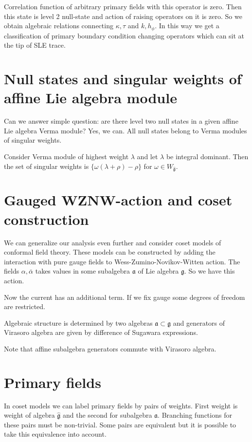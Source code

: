 \documentclass[a4paper]{article}
\newcommand{\gfh}{\hat{\mathfrak{g}}}
\newcommand{\gf}{\mathfrak{g}}
\newcommand{\af}{\mathfrak{a}}
\begin{document}
Correlation function of arbitrary primary fields with this operator is zero. Then this state is
level 2 null-state and action of raising operators on it is zero. So we obtain algebraic relations
connecting $\kappa, \tau$ and $k, h_{\phi}$. In this way we get a classification of primary boundary
condition changing operators which can sit at the tip of SLE trace. 

\section{Null states and singular weights of affine Lie algebra module}
\label{sec:null-states-singular}

Can we answer simple question: are there level two null states in a given affine Lie algebra Verma
module? Yes, we can. All null states belong to Verma modules of singular weights. 

Consider Verma module of highest weight $\lambda$ and let $\lambda$ be integral dominant. Then the
set of singular weights is $\{\omega (\lambda+\rho)-\rho\}$ for $\omega\in W_{\gfh}$.

\section{Gauged WZNW-action and coset construction}
\label{sec:gauged-wznw-action}

We can generalize our analysis even further and consider coset models of conformal field theory.
These models can be constructed by adding the interaction with pure gauge fields to
Wess-Zumino-Novikov-Witten action. The fields $\alpha, \bar \alpha$ takes values in some subalgebra
$\af$ of Lie algebra $\gf$.  So we have this action. 

Now the current has an additional term. If we fix gauge some degrees of freedom are restricted. 

Algebraic structure is determined by two algebras $\af\subset\gf$ and generators of Virasoro algebra
are given by difference of Sugawara expressions. 

Note that affine subalgebra generators commute with Virasoro algebra. 

\section{Primary fields}
\label{sec:primary-fields-1}

In coset models we can label primary fields by pairs of weights. First weight is weight of algebra
$\gfh$ and the second for subalgebra $\af$. Branching functions for these pairs must be non-trivial.
Some pairs are equivalent but it is possible to take this equivalence into account. 
\end{document}
